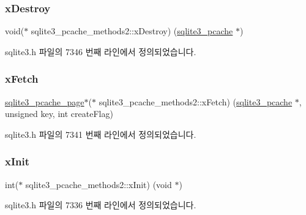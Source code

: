 \subsubsection{\texorpdfstring{x\+Destroy}{xDestroy}}
{\footnotesize\ttfamily void($\ast$ sqlite3\+\_\+pcache\+\_\+methods2\+::x\+Destroy) (\hyperlink{sqlite3_8h_a096c453d937d51f7926d7d31c8e0bd2f}{sqlite3\+\_\+pcache} $\ast$)}



sqlite3.\+h 파일의 7346 번째 라인에서 정의되었습니다.

\mbox{\label{structsqlite3__pcache__methods2_a6283d91a6ad5037fad33003c2198c9f7}} 
\subsubsection{\texorpdfstring{x\+Fetch}{xFetch}}
{\footnotesize\ttfamily \hyperlink{structsqlite3__pcache__page}{sqlite3\+\_\+pcache\+\_\+page}$\ast$($\ast$ sqlite3\+\_\+pcache\+\_\+methods2\+::x\+Fetch) (\hyperlink{sqlite3_8h_a096c453d937d51f7926d7d31c8e0bd2f}{sqlite3\+\_\+pcache} $\ast$, unsigned key, int create\+Flag)}



sqlite3.\+h 파일의 7341 번째 라인에서 정의되었습니다.

\mbox{\label{structsqlite3__pcache__methods2_a21f7fdd82d029d3b0567c573c012adfc}} 
\subsubsection{\texorpdfstring{x\+Init}{xInit}}
{\footnotesize\ttfamily int($\ast$ sqlite3\+\_\+pcache\+\_\+methods2\+::x\+Init) (void $\ast$)}



sqlite3.\+h 파일의 7336 번째 라인에서 정의되었습니다.

\mbox{\label{structsqlite3__pcache__methods2_a16b85f7889b050702c739eccf2f0c036}} 
